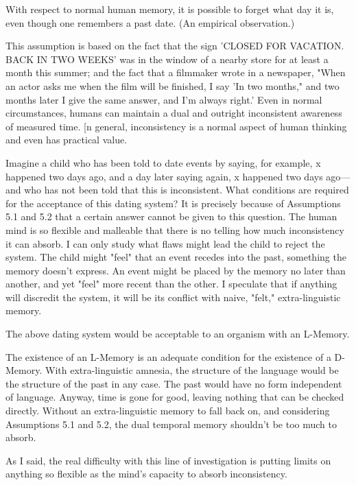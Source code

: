 \documentclass[10pt,twoside,draft]{memoir}
\begin{document}
{{ With respect to normal human memory, it is possible 
to forget what day it is, even though one remembers a past date. (An 
empirical observation.) 

 This assumption is based on the fact that the sign 
'CLOSED FOR VACATION. BACK IN TWO WEEKS' was in the window of 
a nearby store for at least a month this summer; and the fact that a 
filmmaker wrote in a newspaper, "When an actor asks me when the film will 
be finished, I say 'In two months," and two months later I give the same 
answer, and I'm always right.' Even in normal circumstances, humans can 
maintain a dual and outright inconsistent awareness of measured time. [n 
general, inconsistency is a normal aspect of human thinking and even has 
practical value. 

Imagine a child who has been told to date events by saying, for 
example, x happened two days ago, and a day later saying again, x happened 
two days ago---and who has not been told that this is inconsistent. What 
conditions are required for the acceptance of this dating system? It is 
precisely because of Assumptions 5.1 and 5.2 that a certain answer cannot 
be given to this question. The human mind is so flexible and malleable that 
there is no telling how much inconsistency it can absorb. I can only study 
what flaws might lead the child to reject the system. The child might "feel" 
that an event recedes into the past, something the memory doesn't express. 
An event might be placed by the memory no later than another, and yet 
"feel" more recent than the other. I speculate that if anything will discredit 
the system, it will be its conflict with naive, "felt," extra-linguistic memory. 

 The above dating system would be acceptable to an 
organism with an L-Memory. 

 The existence of an L-Memory is an adequate condition 
for the existence of a D-Memory. With extra-linguistic amnesia, the 
structure of the language would be the structure of the past in any case. The 
past would have no form independent of language. Anyway, time is gone for 
good, leaving nothing that can be checked directly. Without an 
extra-linguistic memory to fall back on, and considering Assumptions 5.1 
and 5.2, the dual temporal memory shouldn't be too much to absorb. 

As I said, the real difficulty with this line of investigation is putting 
limits on anything so flexible as the mind's capacity to absorb inconsistency. 

}}
\end{document}
